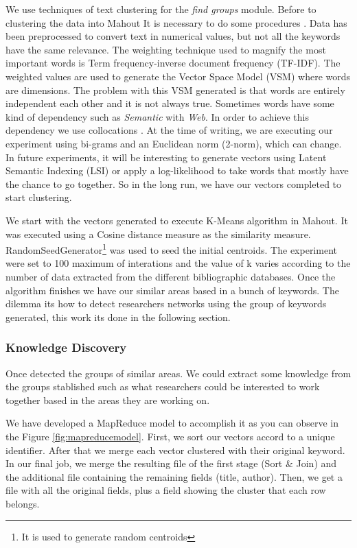 \documentclass[11pt]{article}
\begin{document}
We use techniques of text clustering \cite{Andrews} for the \emph{find groups} module. Before to clustering the data into Mahout It is necessary to do some procedures . Data has been preprocessed to convert text in numerical values, but not all the keywords have the same relevance. The weighting technique used to magnify the most important words is Term frequency-inverse document frequency (TF-IDF). The weighted values are used to generate the Vector Space Model (VSM) where words are dimensions. The problem with this VSM generated is that words are entirely independent each other and it is not always true. Sometimes words have some kind of dependency such as \emph{Semantic} with \emph{Web}. In order to achieve this dependency we use collocations \cite{Manning}. At the time of writing, we are executing our experiment using bi-grams and an Euclidean norm (2-norm), which can change. In future experiments, it will be interesting to generate vectors using Latent Semantic Indexing (LSI) or apply a log-likelihood to take words that mostly have the chance to go together. So in the long run, we have our vectors completed to start clustering.

We start with the vectors generated to execute K-Means algorithm in Mahout. It was executed using a Cosine distance measure as the similarity measure. RandomSeedGenerator\footnote{It is used to generate random centroids} was used to seed the initial centroids. The experiment were set to 100 maximum of interations and the value of k varies according to the number of data extracted from the different bibliographic databases. Once the algorithm finishes we have our similar areas based in a bunch of keywords. The dilemma its how to detect researchers networks using the group of keywords generated, this work its done in the following section.


\subsubsection{Knowledge Discovery}

Once detected the groups of similar areas. We could extract some knowledge from the groups stablished such as what researchers could be interested to work together based in the areas they are working on. 

We have developed a MapReduce model to accomplish it as you can observe in the Figure \ref{fig:mapreducemodel}. First, we sort our vectors accord to a unique identifier. After that we merge each vector clustered with their original keyword. In our final job, we merge the resulting file of the first stage (Sort \& Join) and the additional file containing the remaining fields (title, author). Then, we get a file with all the original fields, plus a field showing the cluster that each row belongs.
\end{document}
